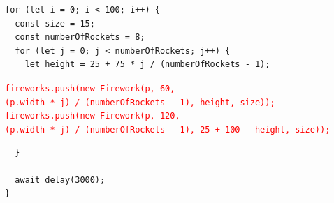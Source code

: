 \documentclass{article}
\begin{document}
    \begin{tcolorbox}[colback=gray!30, colframe=white]
        \begin{verbatim}
for (let i = 0; i < 100; i++) {
  const size = 15;
  const numberOfRockets = 8;
  for (let j = 0; j < numberOfRockets; j++) {
    let height = 25 + 75 * j / (numberOfRockets - 1); \end{verbatim}
        \vspace{-0.4cm}
        \hspace{0.7cm}
        \texttt{\textcolor{red}{fireworks.push(new Firework(p, 60,}} \\
        \hspace{1.5cm}
        \texttt{\textcolor{red}{(p.width * j) / (numberOfRockets - 1), height, size));}} \\
        \hspace{0.7cm}
        \texttt{\textcolor{red}{fireworks.push(new Firework(p, 120,}} \\
        \hspace{1.5cm}
        \texttt{\textcolor{red}{(p.width * j) / (numberOfRockets - 1), 25 + 100 - height, size));}} 
        \vspace{-0.4cm}
        \begin{verbatim}
  }

  await delay(3000);
}\end{verbatim}
    \end{tcolorbox}

    \vspace{0.5cm}
    \vspace{0.5cm}

\end{document}
